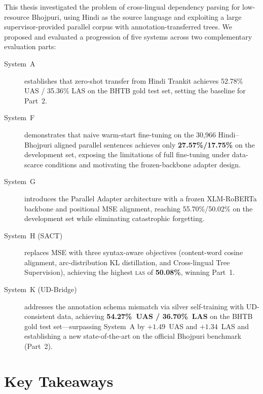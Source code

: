 \documentclass[12pt,a4paper,oneside]{report}
\newcommand{\xlmr}{XLM-RoBERTa}
\newcommand{\las}{\textsc{las}}
\begin{document}
This thesis investigated the problem of cross-lingual dependency parsing for
low-resource Bhojpuri, using Hindi as the source language and exploiting a large
supervisor-provided parallel corpus with annotation-transferred trees. We proposed
and evaluated a progression of five systems across two complementary evaluation parts:

\begin{description}
  \item[System~A] establishes that zero-shot transfer from Hindi Trankit achieves
        52.78\% UAS / 35.36\% LAS on the BHTB gold test set, setting the baseline
        for Part~2.

  \item[System~F] demonstrates that naive warm-start fine-tuning on the 30,966
        Hindi--Bhojpuri aligned parallel sentences achieves only \textbf{27.57\%/17.75\%}
        on the development set, exposing the limitations of full fine-tuning under
        data-scarce conditions and motivating the frozen-backbone adapter design.

  \item[System~G] introduces the Parallel Adapter architecture with a frozen \xlmr{}
        backbone and positional MSE alignment, reaching 55.70\%/50.02\% on the
        development set while eliminating catastrophic forgetting.

  \item[System~H (SACT)] replaces MSE with three syntax-aware objectives
        (content-word cosine alignment, arc-distribution KL distillation, and
        Cross-lingual Tree Supervision), achieving the highest \las{} of
        \textbf{50.08\%}, winning Part~1.

  \item[System~K (UD-Bridge)] addresses the annotation schema mismatch via silver
        self-training with UD-consistent data, achieving \textbf{54.27\%~UAS /
        36.70\%~LAS} on the BHTB gold test set---surpassing System~A by
        $+1.49$~UAS and $+1.34$~LAS and establishing a new state-of-the-art on
        the official Bhojpuri benchmark (Part~2).
\end{description}

\section{Key Takeaways}
\end{document}
